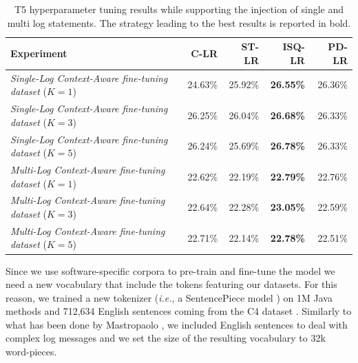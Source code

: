 \begin{table}[h!]
	\centering
	\caption{T5 hyperparameter tuning results while supporting the injection of single and multi log statements. The strategy leading to the best results is reported in bold.}
	\begin{tabular}{lrrrr}
		\toprule
		\textbf{Experiment}                  																		& \textbf{C-LR}              & \textbf{ST-LR}      & \textbf{ISQ-LR}        & \textbf{PD-LR} \\
		\midrule
		\textit{Single-Log Context-Aware fine-tuning dataset} ($K=1$)                         &   24.63\%                & 25.92\%    		           & \textbf{26.55\%}           &  26.36\%         \\
		\textit{Single-Log Context-Aware fine-tuning dataset} ($K=3$)                        &   26.25\%                & 26.04\%    		           & \textbf{26.68\%}          &  26.33\%         \\
		\textit{Single-Log Context-Aware fine-tuning dataset} ($K=5$)                         &  26.24\%                & 25.69\%    		           & \textbf{26.78\%}           &  26.33\%         \\
		\bottomrule
		\textit{Multi-Log Context-Aware fine-tuning dataset} ($K=1$)                         &   22.62\%                & 22.19\%    		           & \textbf{22.79\%}           &  22.76\%         \\
		\textit{Multi-Log Context-Aware fine-tuning dataset} ($K=3$)                        &   22.64\%                & 22.28\%    		           & \textbf{23.05\%}          &  22.59\%         \\
		\textit{Multi-Log Context-Aware fine-tuning dataset} ($K=5$)                         &   22.71\%                & 22.14\%    		           & \textbf{22.78\%}           &  22.51\%         \\
		\bottomrule
	\end{tabular}
	
	\label{tab:hp-results}
\end{table}

Since we use software-specific corpora to pre-train and fine-tune the model we need a new vocabulary that include the \java tokens featuring our datasets. For this reason, we trained a new tokenizer (\emph{i.e.}, a SentencePiece model \cite{kudo2018sentencepiece}) on 1M Java methods and 712,634 English sentences coming from the C4 dataset \cite{raffel2019exploring}. Similarly to what has been done by Mastropaolo \etal \cite{mastropaolo2022using}, we included English sentences to deal with complex log messages and we set the size of the resulting vocabulary to 32k word-pieces.

